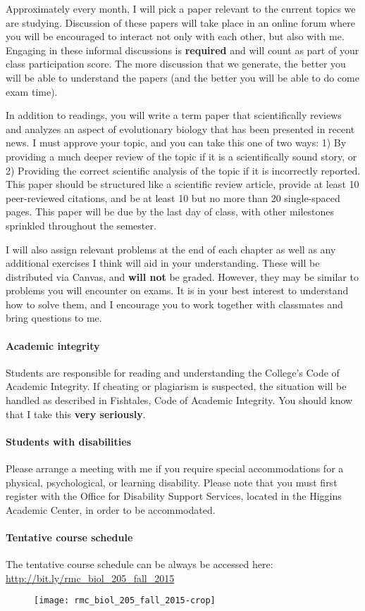\documentclass{article}
\begin{document}
Approximately every month, I will pick a paper relevant to the current
topics we are
studying. Discussion of these papers will take place in an online forum where
you will be encouraged to interact not only with each other, but also with me.
Engaging in these informal discussions is \textbf{required} and will count as
part of your class participation score. The more discussion that we generate,
the better you will be able to understand the papers (and the better you will
be able to do come exam time).

In addition to readings, you will write a term paper that scientifically
reviews and analyzes an aspect of evolutionary biology that has been presented
in recent news. I must approve your topic, and you can take this one of two
ways: 1) By providing a much deeper review of the topic if it is a
scientifically sound story, or 2) Providing the correct scientific analysis of
the topic if it is incorrectly reported. This paper should be structured like
a scientific review article, provide at least 10 peer-reviewed citations, and
be at least 10 but no more than 20 single-spaced pages.  This paper will be due
by the last day of class, with other milestones sprinkled throughout the
semester.

I will also assign relevant problems at the end of each chapter as well as any
additional exercises I think will aid in your understanding. These will be
distributed via Canvas, and \textbf{will not} be graded.  However, they may be
similar to problems you will encounter on exams.  It is in your best interest
to understand how to solve them, and I encourage you to work together with
classmates and bring questions to me.


\paragraph{Academic integrity}
Students are responsible for reading and
understanding the College's Code of Academic Integrity.  If cheating or
plagiarism is suspected, the situation will be handled as described in
Fishtales, Code of Academic Integrity. You should know that I take this \textbf
{very seriously}.

\paragraph{Students with disabilities}
Please arrange a meeting with me if you
require special accommodations for a physical, psychological, or learning
disability.  Please note that you must first register with the Office for
Disability Support Services, located in the Higgins Academic Center, in order
to be accommodated.

\paragraph{Tentative course schedule}
The tentative course schedule can be always be accessed here: \\
\url{http://bit.ly/rmc_biol_205_fall_2015}

\begin{figure}[h]
\centering
\texttt{[image: rmc\_biol\_205\_fall\_2015-crop]}	
\end{figure}
\end{document}
